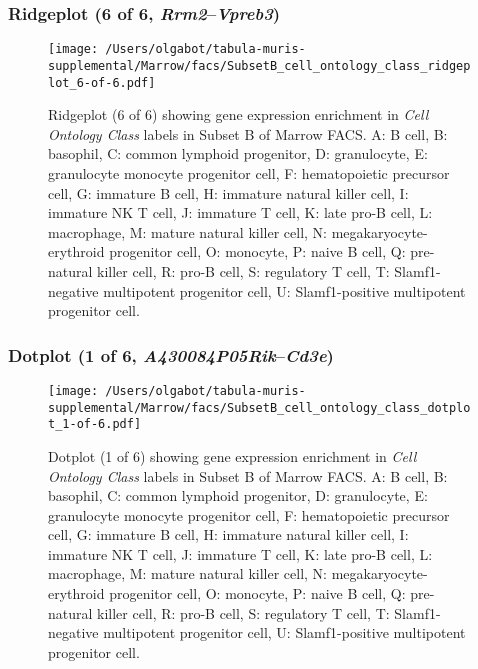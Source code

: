 \subsubsection{Ridgeplot (6 of 6, \emph{Rrm2}--\emph{Vpreb3})}
\begin{figure}[h]
\centering
\texttt{[image: /Users/olgabot/tabula-muris-supplemental/Marrow/facs/SubsetB\_cell\_ontology\_class\_ridgeplot\_6-of-6.pdf]}

\caption{ Ridgeplot (6 of 6)  showing gene expression enrichment in \emph{Cell Ontology Class} labels in Subset B of Marrow FACS. A: B cell, B: basophil, C: common lymphoid progenitor, D: granulocyte, E: granulocyte monocyte progenitor cell, F: hematopoietic precursor cell, G: immature B cell, H: immature natural killer cell, I: immature NK T cell, J: immature T cell, K: late pro-B cell, L: macrophage, M: mature natural killer cell, N: megakaryocyte-erythroid progenitor cell, O: monocyte, P: naive B cell, Q: pre-natural killer cell, R: pro-B cell, S: regulatory T cell, T: Slamf1-negative multipotent progenitor cell, U: Slamf1-positive multipotent progenitor cell.}
\end{figure}


\clearpage

\subsubsection{Dotplot (1 of 6, \emph{A430084P05Rik}--\emph{Cd3e})}
\begin{figure}[h]
\centering
\texttt{[image: /Users/olgabot/tabula-muris-supplemental/Marrow/facs/SubsetB\_cell\_ontology\_class\_dotplot\_1-of-6.pdf]}

\caption{ Dotplot (1 of 6)  showing gene expression enrichment in \emph{Cell Ontology Class} labels in Subset B of Marrow FACS. A: B cell, B: basophil, C: common lymphoid progenitor, D: granulocyte, E: granulocyte monocyte progenitor cell, F: hematopoietic precursor cell, G: immature B cell, H: immature natural killer cell, I: immature NK T cell, J: immature T cell, K: late pro-B cell, L: macrophage, M: mature natural killer cell, N: megakaryocyte-erythroid progenitor cell, O: monocyte, P: naive B cell, Q: pre-natural killer cell, R: pro-B cell, S: regulatory T cell, T: Slamf1-negative multipotent progenitor cell, U: Slamf1-positive multipotent progenitor cell.}
\end{figure}


\clearpage

